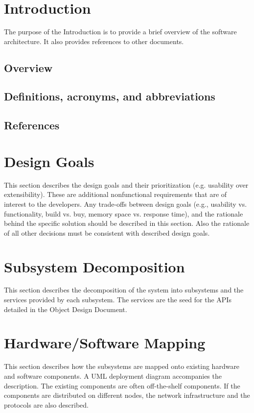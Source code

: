 \documentclass[a4paper,12pt]{scrartcl}
\newenvironment{subs}
{\adjustwidth{3em}{0pt}}
{\endadjustwidth}
\begin{document}
    \section{Introduction}
    The purpose of the Introduction is to provide a brief overview of the software architecture. It also provides references to other documents.
    \begin{subs}
        \subsection{Overview}

        \subsection{Definitions, acronyms, and abbreviations}

        \subsection{References}
    \end{subs}


    \section{Design Goals}
    This section describes the design goals and their prioritization (e.g. usability over extensibility). These are additional nonfunctional requirements that are of interest to the developers. Any trade-offs between design goals (e.g., usability vs. functionality, build vs. buy, memory space vs. response time), and the rationale behind the specific solution should be described in this section. Also the rationale of all other decisions must be consistent with described design goals.


    \section{Subsystem Decomposition}
    This section describes the decomposition of the system into subsystems and the services provided by each subsystem. The services are the seed for the APIs detailed in the Object Design Document.


    \section{Hardware/Software Mapping}
    This section describes how the subsystems are mapped onto existing hardware and software components. A UML deployment diagram accompanies the description. The existing components are often off-the-shelf components. If the components are distributed on different nodes, the network infrastructure and the protocols are also described.
\end{document}
